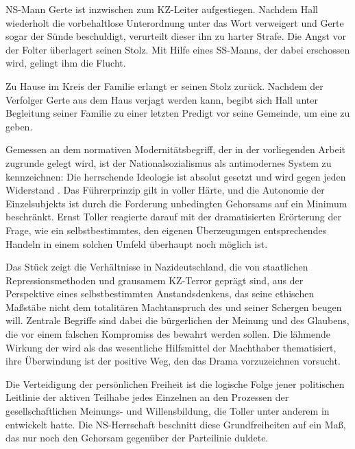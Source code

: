 NS-Mann Gerte ist inzwischen zum KZ-Leiter aufgestiegen. Nachdem Hall
wiederholt die vorbehaltlose Unterordnung unter das Wort \Cite{des Führers}
verweigert und Gerte sogar der Sünde beschuldigt, verurteilt dieser ihn zu harter
Strafe. Die Angst vor der Folter überlagert seinen Stolz. Mit Hilfe
eines SS-Manns, der dabei erschossen wird, gelingt ihm die Flucht.

Zu Hause im Kreis der Familie erlangt er seinen Stolz zurück. Nachdem der
Verfolger Gerte aus dem Haus verjagt werden kann, begibt sich Hall unter
Begleitung seiner Familie zu einer letzten Predigt vor seine Gemeinde, um
eine \Cite{Beispiel}  zu geben.


Gemessen an dem normativen Modernitätsbegriff, der in der vorliegenden
Arbeit zugrunde gelegt wird, ist der Nationalsozialismus als antimodernes
System zu kennzeichnen: Die herrschende Ideologie ist absolut gesetzt und wird
gegen jeden Widerstand . Das Führerprinzip gilt in
voller Härte, und die Autonomie der Einzelsubjekts ist durch die Forderung
unbedingten Gehorsams auf ein Minimum beschränkt. Ernst Toller reagierte
darauf mit der dramatisierten Erörterung der Frage, wie ein
selbstbestimmtes, den eigenen Überzeugungen entsprechendes Handeln in einem
solchen Umfeld überhaupt noch möglich ist. 

Das Stück zeigt die Verhältnisse in Nazideutschland, die von staatlichen
Repressionsmethoden und grausamem KZ-Terror geprägt sind, aus der Perspektive
eines selbstbestimmten Anstandsdenkens, das seine ethischen Maßstäbe nicht dem
totalitären Machtanspruch des \Cite{Führers} und seiner Schergen beugen will.
Zentrale Begriffe sind dabei die bürgerlichen \Cite{Freiheiten} der Meinung
und des Glaubens, die vor einem falschen Kompromiss des \Cite{Schweigens}
bewahrt werden sollen. Die lähmende Wirkung der \Cite{Furcht} wird als das
wesentliche Hilfsmittel der Machthaber thematisiert, ihre Überwindung ist der
positive Weg, den das Drama vorzuzeichnen vorsucht.

Die Verteidigung der persönlichen Freiheit ist die logische Folge jener
politischen Leitlinie der aktiven Teilhabe jedes Einzelnen an den Prozessen der
gesellschaftlichen Meinungs- und Willensbildung, die Toller unter anderem in
 entwickelt hatte. Die NS-Herrschaft beschnitt diese
Grundfreiheiten auf ein Maß, das nur noch den Gehorsam gegenüber der
Parteilinie duldete. 

